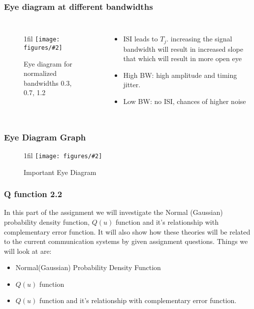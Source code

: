 \documentclass{beamer}
\makeatletter
\newcommand*{\centerfloat}{%
  \parindent \z@
  \leftskip \z@ \@plus 1fil \@minus \textwidth
  \rightskip\leftskip
  \parfillskip \z@skip}
\newcommand{\fig}[3]{
  \begin{figure}[H]
  \centerfloat
    \texttt{[image: figures/\#2]}
    \caption{#3}
  \end{figure}
}
\makeatother
\begin{document}
\begin{frame}
	\frametitle{Eye diagram at different bandwidths}
	\begin{columns}
			\fig{8cm}{eye2.png}{Eye diagram for normalized bandwidths 0.3, 0.7, 1.2}
			\begin{itemize}
				\item ISI leads to $T_j$. increasing the signal bandwidth will result in increased slope that  which will result in more open eye
				\item High BW: high amplitude and timing jitter.
				\item Low BW: no ISI, chances of higher noise
			\end{itemize}
	\end{columns}
\end{frame}

\begin{frame}
	\frametitle{Eye Diagram Graph}
	\fig{8cm}{important_eye_diag.png}{Important Eye Diagram}
\end{frame}
\begin{frame}
	\frametitle{ Q function 2.2}
In this part of the assignment we will investigate the  Normal (Gaussian) probability density function, $Q(u)$ function and it's relationship with complementary error function. It will also show how these theories will be related to the current communication systems by given assignment questions. Things we will look at are:

	\begin{itemize}
		\item Normal(Gaussian) Probability Density Function
		\item $Q(u)$ function
		\item $Q(u)$ function and it's relationship with complementary error function.
	\end{itemize}
\end{frame}
\end{document}
